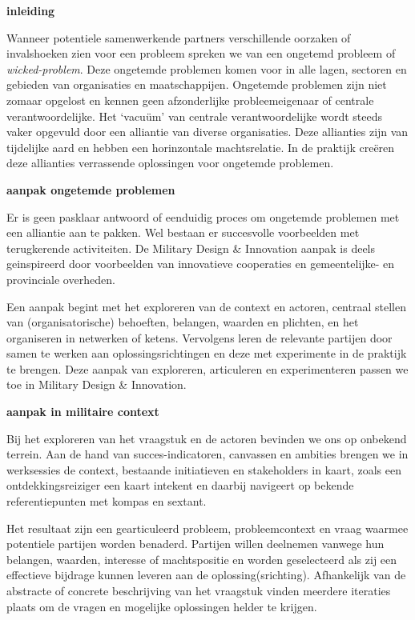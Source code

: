 \documentclass[
]{book}
\begin{document}
\textbf{inleiding}

Wanneer potentiele samenwerkende partners verschillende oorzaken of invalshoeken zien voor een probleem spreken we van een ongetemd probleem of \emph{wicked-problem}. Deze ongetemde problemen komen voor in alle lagen, sectoren en gebieden van organisaties en maatschappijen. Ongetemde problemen zijn niet zomaar opgelost en kennen geen afzonderlijke probleemeigenaar of centrale verantwoordelijke. Het `vacuüm' van centrale verantwoordelijke wordt steeds vaker opgevuld door een alliantie van diverse organisaties. Deze allianties zijn van tijdelijke aard en hebben een horinzontale machtsrelatie. In de praktijk creëren deze allianties verrassende oplossingen voor ongetemde problemen.

\textbf{aanpak ongetemde problemen}

Er is geen pasklaar antwoord of eenduidig proces om ongetemde problemen met een alliantie aan te pakken. Wel bestaan er succesvolle voorbeelden met terugkerende activiteiten. De Military Design \& Innovation aanpak is deels geinspireerd door voorbeelden van innovatieve cooperaties en gemeentelijke- en provinciale overheden.

Een aanpak begint met het exploreren van de context en actoren, centraal stellen van (organisatorische) behoeften, belangen, waarden en plichten, en het organiseren in netwerken of ketens. Vervolgens leren de relevante partijen door samen te werken aan oplossingsrichtingen en deze met experimente in de praktijk te brengen. Deze aanpak van exploreren, articuleren en experimenteren passen we toe in Military Design \& Innovation.

\textbf{aanpak in militaire context}

Bij het exploreren van het vraagstuk en de actoren bevinden we ons op onbekend terrein. Aan de hand van succes-indicatoren, canvassen en ambities brengen we in werksessies de context, bestaande initiatieven en stakeholders in kaart, zoals een ontdekkingsreiziger een kaart intekent en daarbij navigeert op bekende referentiepunten met kompas en sextant.

Het resultaat zijn een gearticuleerd probleem, probleemcontext en vraag waarmee potentiele partijen worden benaderd. Partijen willen deelnemen vanwege hun belangen, waarden, interesse of machtspositie en worden geselecteerd als zij een effectieve bijdrage kunnen leveren aan de oplossing(srichting). Afhankelijk van de abstracte of concrete beschrijving van het vraagstuk vinden meerdere iteraties plaats om de vragen en mogelijke oplossingen helder te krijgen.
\end{document}
